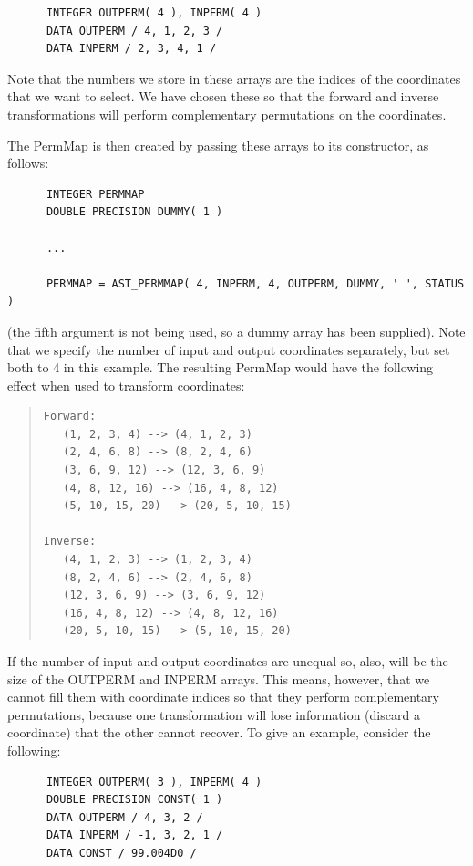 \documentclass[twoside,11pt]{article}
\begin{document}
\small
\begin{verbatim}
      INTEGER OUTPERM( 4 ), INPERM( 4 )
      DATA OUTPERM / 4, 1, 2, 3 /
      DATA INPERM / 2, 3, 4, 1 /
\end{verbatim}
\normalsize

Note that the numbers we store in these arrays are the indices of the
coordinates that we want to select. We have chosen these so that the
forward and inverse transformations will perform complementary
permutations on the coordinates.

The PermMap is then created by passing these arrays to its
constructor, as follows:

\small
\begin{verbatim}
      INTEGER PERMMAP
      DOUBLE PRECISION DUMMY( 1 )

      ...

      PERMMAP = AST_PERMMAP( 4, INPERM, 4, OUTPERM, DUMMY, ' ', STATUS )
\end{verbatim}
\normalsize

(the fifth argument is not being used, so a dummy array has been supplied).
Note that we specify the number of input and output coordinates
separately, but set both to 4 in this example. The resulting PermMap
would have the following effect when used to transform coordinates:

\begin{quote}
\begin{verbatim}
Forward:
   (1, 2, 3, 4) --> (4, 1, 2, 3)
   (2, 4, 6, 8) --> (8, 2, 4, 6)
   (3, 6, 9, 12) --> (12, 3, 6, 9)
   (4, 8, 12, 16) --> (16, 4, 8, 12)
   (5, 10, 15, 20) --> (20, 5, 10, 15)

Inverse:
   (4, 1, 2, 3) --> (1, 2, 3, 4)
   (8, 2, 4, 6) --> (2, 4, 6, 8)
   (12, 3, 6, 9) --> (3, 6, 9, 12)
   (16, 4, 8, 12) --> (4, 8, 12, 16)
   (20, 5, 10, 15) --> (5, 10, 15, 20)
\end{verbatim}
\end{quote}

If the number of input and output coordinates are unequal so, also,
will be the size of the OUTPERM and INPERM arrays. This means,
however, that we cannot fill them with coordinate indices so that they
perform complementary permutations, because one transformation will
lose information (discard a coordinate) that the other cannot recover.
To give an example, consider the following:

\small
\begin{verbatim}
      INTEGER OUTPERM( 3 ), INPERM( 4 )
      DOUBLE PRECISION CONST( 1 )
      DATA OUTPERM / 4, 3, 2 /
      DATA INPERM / -1, 3, 2, 1 /
      DATA CONST / 99.004D0 /
\end{verbatim}
\normalsize
\end{document}
